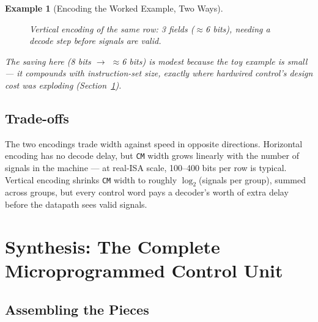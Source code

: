 \documentclass[11pt]{article}
\newtheorem{example}{Example}[section]
\begin{document}
\begin{example}[Encoding the Worked Example, Two Ways]
\begin{figure}[h]
  \centering
  \caption{Vertical encoding of the same row: 3 fields ($\approx$6 bits), needing a decode step before signals are valid.}
  \label{fig:vertical}
\end{figure}

The saving here (8 bits $\to$ $\approx$6 bits) is modest because the toy example is small --- it compounds with instruction-set size, exactly where hardwired control's design cost was exploding (Section~\ref{sec:synthesis}).
\end{example}

\subsection{Trade-offs}

The two encodings trade width against speed in opposite directions. Horizontal encoding has no decode delay, but \texttt{CM} width grows linearly with the number of signals in the machine --- at real-ISA scale, 100--400 bits per row is typical. Vertical encoding shrinks \texttt{CM} width to roughly $\log_2$(signals per group), summed across groups, but every control word pays a decoder's worth of extra delay before the datapath sees valid signals.

\section{Synthesis: The Complete Microprogrammed Control Unit}
\label{sec:synthesis}

\subsection{Assembling the Pieces}
\end{document}
